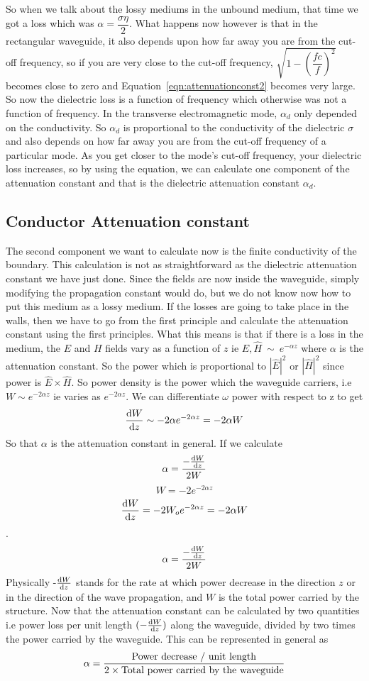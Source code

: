 So when we talk about the lossy mediums in the unbound medium, that time we got a loss which was $\alpha = \dfrac{\sigma\eta}{2}$. What happens now however is that in the rectangular waveguide, it also depends upon how far away you are from the cut-off frequency, so if you are very close to the cut-off frequency, $\sqrt{1 - \left(\dfrac{fc}{f}\right)^{2}}$ becomes close to zero and Equation~\ref{eqn:attenuationconst2} becomes very large. So now the dielectric loss is a function of frequency which otherwise was not a function of frequency. In the transverse electromagnetic mode,  $\alpha_{d}$ only depended on the conductivity. So $\alpha_{d}$ is proportional to the conductivity of the dielectric $\sigma$ and also depends on how far away you are from the cut-off frequency of a particular mode. As you get closer to the mode's cut-off frequency, your dielectric loss increases, so by using the equation, we can calculate one component of the attenuation constant and that is the dielectric attenuation constant $\alpha_{d}$.

\subsection{Conductor Attenuation constant}
The second component we want to calculate now is the finite conductivity of the boundary. This calculation is not as straightforward as the dielectric attenuation constant we have just done. Since the fields are now inside the waveguide, simply modifying the propagation constant would do, but we do not know now how to put this medium as a lossy medium. If the losses are going to take place in the walls, then we have to go from the first principle and calculate the attenuation constant using the first principles. What this means is that if there is a loss in the medium, the $E$ and $H$ fields vary as a function of $z$ ie $ {\hat{E}}, {\hat{H}} \ \sim\ e^{-\alpha z}$ where $\alpha$ is the attenuation constant. So the power which is proportional to $|{\hat{E}}|^{2}$ or $|{\hat{H}}|^{2}$ since power is ${\hat{E}}\times{\hat{H}}$. So power density is the power which the waveguide carriers, i.e $W\sim e^{-2\alpha z}$ ie varies as $e^{-2\alpha z}$. We can differentiate $\omega$ power with respect to z to get 
$$\dv{W}{z}\sim-2\alpha e^{-2\alpha z} = -2\alpha W$$ 
So that $\alpha$ is the attenuation constant in general. If we calculate 
$$\alpha = \dfrac{-\dv{W}{z}}{2W}$$
$$W = -2e^{-2\alpha z}$$ 
$$\dv{W}{z} = -2W_o e^{-2\alpha z} = -2\alpha W$$. 
$$\alpha = \dfrac{-\dv{W}{z}}{2W}$$ 
Physically -$\dv{W}{z}$ stands for the rate at which power decrease in the direction $z$ or in the direction of the wave propagation, and $W$ is the total power carried by the structure. Now that the attenuation constant can be calculated by two quantities i.e power loss per unit length $(-\dv{W}{z})$  along the waveguide, divided by two times the power carried by the waveguide. This can be represented in general as
\begin{dmath}
\alpha = \dfrac{\textnormal{Power decrease / unit length}}{2\times \textnormal{Total power carried by the waveguide}}
\end{dmath}

